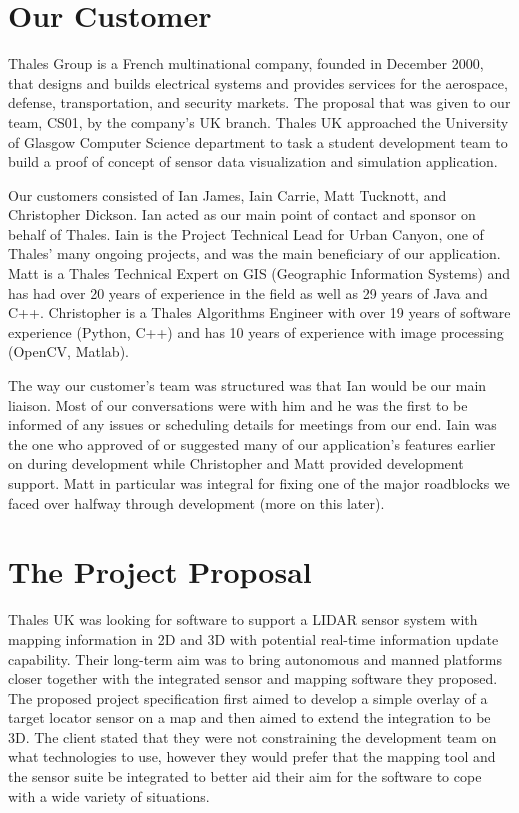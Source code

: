 \documentclass{l3proj}
\begin{document}
\section{Our Customer}

Thales Group\cite{thales} is a French multinational company, founded in December 2000, that designs and builds electrical systems and provides services for the aerospace, defense, transportation, and security markets. The proposal that was given to our team, CS01, by the company’s UK branch. Thales UK\cite{thalesUK} approached the University of Glasgow Computer Science department to task a student development team to build a proof of concept of sensor data visualization and simulation application.

Our customers consisted of Ian James, Iain Carrie, Matt Tucknott, and Christopher Dickson. Ian acted as our main point of contact and sponsor on behalf of Thales. Iain is the Project Technical Lead for Urban Canyon, one of Thales’ many ongoing projects, and was the main beneficiary of our application. Matt is a Thales Technical Expert on GIS (Geographic Information Systems)\cite{gis} and has had over 20 years of experience in the field as well as 29 years of Java and C++. Christopher is a Thales Algorithms Engineer with over 19 years of software experience (Python, C++) and has 10 years of experience with image processing (OpenCV, Matlab).

The way our customer’s team was structured was that Ian would be our main liaison. Most of our conversations were with him and he was the first to be informed of any issues or scheduling details for meetings from our end. Iain was the one who approved of or suggested many of our application’s features earlier on during development while Christopher and Matt provided development support. Matt in particular was integral for fixing one of the major roadblocks we faced over halfway through development (more on this later). 

\section{The Project Proposal}

Thales UK was looking for software to support a LIDAR sensor system with mapping information in 2D and 3D with potential real-time information update capability. Their long-term aim was to bring autonomous and manned platforms closer together with the integrated sensor and mapping software they proposed. The proposed project specification first aimed to develop a simple overlay of a target locator sensor on a map and then aimed to extend the integration to be 3D. The client stated that they were not constraining the development team on what technologies to use, however they would prefer that the mapping tool and the sensor suite be integrated to better aid their aim for the software to cope with a wide variety of situations.
\end{document}
